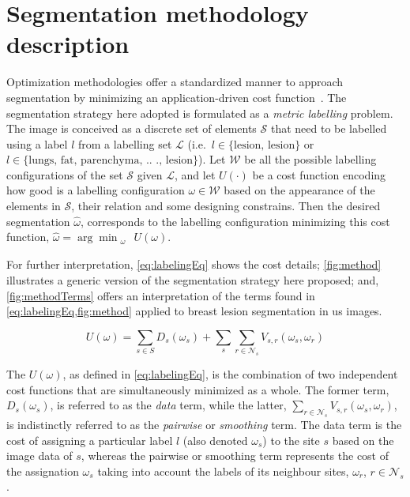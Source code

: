 \graphicspath{ {./content/method/figures/} }

\section{Segmentation methodology description} 

Optimization methodologies offer a standardized manner to approach segmentation by minimizing an application-driven cost function~\cite{cremers2007review}.
The segmentation strategy here adopted is formulated as a \emph{metric labelling} problem. 
The image is conceived as a discrete set of elements $\mathcal{S}$ that need to be labelled using a label $l$ from a labelling set $\mathcal{L}$ (i.e.\, $l \in \text{\{lesion, lesion\}}$ or $l \in \text{\{lungs, fat, parenchyma, .. ., lesion\}}$).
Let $\mathcal{W}$ be all the possible labelling configurations of the set $\mathcal{S}$ given $\mathcal{L}$, and let $U(\cdot)$ be a cost function encoding how good is a labelling configuration $\omega \in \mathcal{W}$ based on the appearance of the elements in $\mathcal{S}$, their relation and some designing constrains.
Then the desired segmentation $\hat{\omega}$, corresponds to the labelling configuration minimizing this cost function, $\displaystyle \hat{\omega} = \arg \min_{\substack{\omega}} \,U(\omega)$. 

For further interpretation, \cref{eq:labelingEq} shows the cost details; 
\cref{fig:method} illustrates a generic version of the segmentation strategy here proposed; and, \cref{fig:methodTerms} offers an interpretation of the terms found in \cref{eq:labelingEq,fig:method} applied to breast lesion segmentation in \ac{us} images.

\begin{equation}
  U(\omega) = \sum_{s\in S} D_s(\omega_s) + \sum_{s}\sum_{r \in \mathcal{N}_{s}} V_{s,r}(\omega_s,\omega_r)
  \label{eq:labelingEq}
\end{equation}

The $U(\omega)$, as defined in \cref{eq:labelingEq}, is the combination of two independent cost functions that are simultaneously minimized as a whole. The former term, $D_s(\omega_s)$, is referred to as the \emph{data} term, while the latter, $\sum_{r \in \mathcal{N}_{s}} V_{s,r}(\omega_s,\omega_r)$, is indistinctly referred to as the \emph{pairwise} or \emph{smoothing} term.
 The data term is the cost of assigning a particular label $l$ (also denoted $\omega_s$) to the site $s$ based on the image data of $s$, whereas the pairwise or smoothing term represents the cost of the assignation $\omega_s$ taking into account the labels of its neighbour sites, $\omega_r$, $r \in \mathcal{N}_{s}$. 

